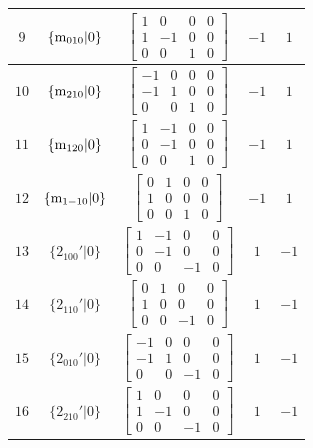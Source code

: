 \documentclass[fleqn,8pt]{jsarticle}
\begin{document}
\begin{longtable}{ccccc}
$ 9 $ & $ \{{\rm m}_{010}|0\} $ & $ \begin{bmatrix} 1 & 0 & 0 & 0 \\ 1 & -1 & 0 & 0 \\ 0 & 0 & 1 & 0 \end{bmatrix} $ & $ -1 $ & $ 1 $ \\ \hline
$ 10 $ & $ \{{\rm m}_{210}|0\} $ & $ \begin{bmatrix} -1 & 0 & 0 & 0 \\ -1 & 1 & 0 & 0 \\ 0 & 0 & 1 & 0 \end{bmatrix} $ & $ -1 $ & $ 1 $ \\ \hline
$ 11 $ & $ \{{\rm m}_{120}|0\} $ & $ \begin{bmatrix} 1 & -1 & 0 & 0 \\ 0 & -1 & 0 & 0 \\ 0 & 0 & 1 & 0 \end{bmatrix} $ & $ -1 $ & $ 1 $ \\ \hline
$ 12 $ & $ \{{\rm m}_{1-10}|0\} $ & $ \begin{bmatrix} 0 & 1 & 0 & 0 \\ 1 & 0 & 0 & 0 \\ 0 & 0 & 1 & 0 \end{bmatrix} $ & $ -1 $ & $ 1 $ \\ \hline
$ 13 $ & $ \{2{}_{100}{}'|0\} $ & $ \begin{bmatrix} 1 & -1 & 0 & 0 \\ 0 & -1 & 0 & 0 \\ 0 & 0 & -1 & 0 \end{bmatrix} $ & $ 1 $ & $ -1 $ \\ \hline
$ 14 $ & $ \{2{}_{110}{}'|0\} $ & $ \begin{bmatrix} 0 & 1 & 0 & 0 \\ 1 & 0 & 0 & 0 \\ 0 & 0 & -1 & 0 \end{bmatrix} $ & $ 1 $ & $ -1 $ \\ \hline
$ 15 $ & $ \{2{}_{010}{}'|0\} $ & $ \begin{bmatrix} -1 & 0 & 0 & 0 \\ -1 & 1 & 0 & 0 \\ 0 & 0 & -1 & 0 \end{bmatrix} $ & $ 1 $ & $ -1 $ \\ \hline
$ 16 $ & $ \{2{}_{210}{}'|0\} $ & $ \begin{bmatrix} 1 & 0 & 0 & 0 \\ 1 & -1 & 0 & 0 \\ 0 & 0 & -1 & 0 \end{bmatrix} $ & $ 1 $ & $ -1 $ \\ \hline

\end{longtable}
\end{document}
